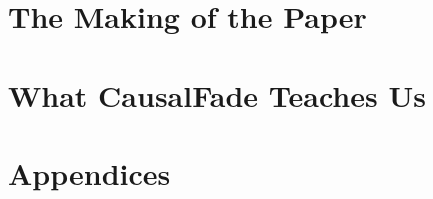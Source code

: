 \documentclass[11pt,oneside,openany]{book}
\theoremstyle{cfmathstyle}
\theoremstyle{cfboxstyle}
\theoremstyle{cfauditstyle}
\DeclareRobustCommand{\_}{\textunderscore\allowbreak}
\begin{document}
\part{The Making of the Paper}


\part{What CausalFade Teaches Us}


\appendix
\part*{Appendices}


\end{document}
